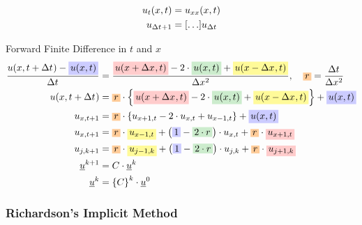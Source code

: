 \documentclass[
	final,
	a4paper,
	oneside,
	parskip=full,
	headings=standardclasses,
	headings=big,
	pointednumbers,
    fleqn
]{scrartcl}
\newcommand{\tfillb}[1]{\tfillc[#1][blue!20]}
\newcommand{\tfillo}[1]{\tfillc[#1][orange!40]}
\newcommand{\tfillg}[1]{\tfillc[#1][Green!20]}
\newcommand{\tfilly}[1]{\tfillc[#1][yellow!40]}
\newcommand{\tfillr}[1]{\tfillc[#1][red!20]}
\newcommand{\f}[2]{\frac{#1}{#2}}
\newcommand{\kl}[1]{{\left( #1 \right)}}
\newcommand{\kq}[1]{{\left\{ #1 \right\}}}
\newcommand{\ks}[1]{{\left[ #1 \right]}}
\begin{document}
    \begin{align*}
        u_{t}\kl{x,t}                               & = u_{xx}\kl{x,t} \\
        u_{\dt + 1} & = \ks{\ldots}  u_{\dt}
    \end{align*}
    
    Forward Finite Difference in $t$ and $x$ \\
    {\setlength{\abovedisplayskip}{-6pt}
    \setlength{\belowdisplayskip}{-12pt}
    \begin{align*}
        \f{u \kl{x, t + \dt} - \tfillb{$u \kl{x, t}$}}{\dt}    & = \f{
            \tfillr{$u \kl{x + \dx, t}$} -
            2 \cdot \tfillg{$u\kl{x, t}$} +
            \tfilly{$u \kl{x - \dx, t}$}
        }{\dx[2]}, \quad \tfillo{$r$}   = \f{\dt}{\dx[2]}  \\
        u \kl{x, t + \dt} & = \tfillo{$r$} \cdot \kq{
            \tfillr{$u \kl{x + \dx, t}$} -
            2 \cdot \tfillg{$u\kl{x, t}$} +
            \tfilly{$u \kl{x - \dx, t}$}
        } + \tfillb{$u \kl{x, t}$} \\
        u_{x,t+1} & = \tfillo{$r$} \cdot \kq{u_{x+1,t} - 2 \cdot u_{x,t} + u_{x-1,t}} + \tfillb{$u \kl{x, t}$} \\
        u_{x,t+1} & = \tfillo{$r$} \cdot \tfilly{$u_{x-1,t}$} + \kl{\tfillb{$1$} - \tfillg{$2\cdot r$}} \cdot u_{x,t} + \tfillo{$r$} \cdot \tfillr{$u_{x+1,t}$} \\
        u_{j,k+1} & = \tfillo{$r$} \cdot \tfilly{$u_{j-1,k}$} + \kl{\tfillb{$1$} - \tfillg{$2\cdot r$}} \cdot u_{j,k} + \tfillo{$r$} \cdot \tfillr{$u_{j+1,k}$} \\
        \uline{u}^{k+1} &= C \cdot \uline{u}^{k} \\
        \uline{u}^{k} &= \kq{C}^{k} \cdot \uline{u}^{0}
    \end{align*}}


    \subsubsection*{Richardson's Implicit Method}
    
\end{document}
